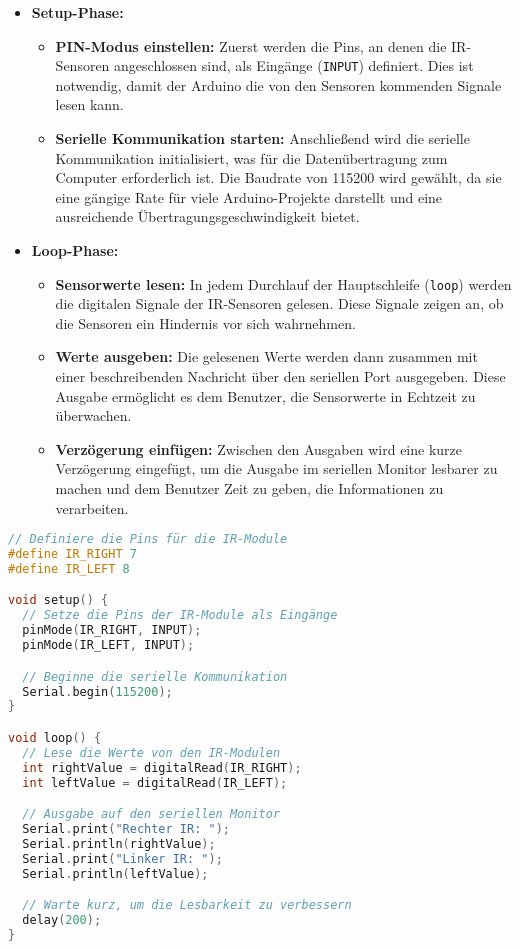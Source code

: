 \documentclass{vorlage-design-main}
\begin{document}
\begin{itemize}

\item
  \textbf{Setup-Phase:}

  \begin{itemize}
  
  \item
    \textbf{PIN-Modus einstellen:} Zuerst werden die Pins, an denen die
    IR-Sensoren angeschlossen sind, als Eingänge
    (\verb|INPUT|) definiert. Dies ist notwendig,
    damit der Arduino die von den Sensoren kommenden Signale lesen kann.
  \item
    \textbf{Serielle Kommunikation starten:} Anschließend wird die
    serielle Kommunikation initialisiert, was für die Datenübertragung
    zum Computer erforderlich ist. Die Baudrate von 115200 wird gewählt,
    da sie eine gängige Rate für viele Arduino-Projekte darstellt und
    eine ausreichende Übertragungsgeschwindigkeit bietet.
  \end{itemize}
\item
  \textbf{Loop-Phase:}

  \begin{itemize}
  
  \item
    \textbf{Sensorwerte lesen:} In jedem Durchlauf der Hauptschleife
    (\verb|loop|) werden die digitalen Signale der
    IR-Sensoren gelesen. Diese Signale zeigen an, ob die Sensoren ein
    Hindernis vor sich wahrnehmen.
  \item
    \textbf{Werte ausgeben:} Die gelesenen Werte werden dann zusammen
    mit einer beschreibenden Nachricht über den seriellen Port
    ausgegeben. Diese Ausgabe ermöglicht es dem Benutzer, die
    Sensorwerte in Echtzeit zu überwachen.
  \item
    \textbf{Verzögerung einfügen:} Zwischen den Ausgaben wird eine kurze
    Verzögerung eingefügt, um die Ausgabe im seriellen Monitor lesbarer
    zu machen und dem Benutzer Zeit zu geben, die Informationen zu
    verarbeiten.
  \end{itemize}
\end{itemize}

\newpage

\begin{lstlisting}[language={C++}]
// Definiere die Pins für die IR-Module
#define IR_RIGHT 7
#define IR_LEFT 8

void setup() {
  // Setze die Pins der IR-Module als Eingänge
  pinMode(IR_RIGHT, INPUT);
  pinMode(IR_LEFT, INPUT);

  // Beginne die serielle Kommunikation
  Serial.begin(115200);
}

void loop() {
  // Lese die Werte von den IR-Modulen
  int rightValue = digitalRead(IR_RIGHT);
  int leftValue = digitalRead(IR_LEFT);

  // Ausgabe auf den seriellen Monitor
  Serial.print("Rechter IR: ");
  Serial.println(rightValue);
  Serial.print("Linker IR: ");
  Serial.println(leftValue);

  // Warte kurz, um die Lesbarkeit zu verbessern
  delay(200);
}
\end{lstlisting}
\end{document}
